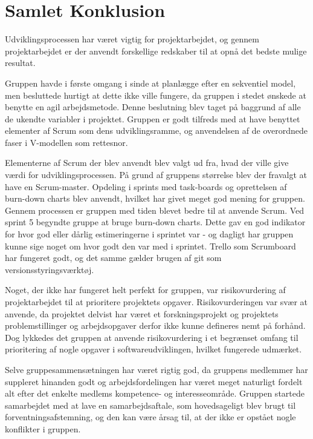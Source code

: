 \chapter{Samlet Konklusion}\label{SamletKonklusion}
Udviklingsprocessen har været vigtig for projektarbejdet, og gennem projektarbejdet er der anvendt forskellige redskaber til at opnå det bedste mulige resultat. 

Gruppen havde i første omgang i sinde at planlægge efter en sekventiel model, men besluttede hurtigt at dette ikke ville fungere, da gruppen i stedet ønskede at benytte en agil arbejdsmetode. Denne beslutning blev taget på baggrund af alle de ukendte variabler i projektet. Gruppen er godt tilfreds med at have benyttet elementer af Scrum som dens udviklingsramme, og anvendelsen af de overordnede faser i V-modellen som rettesnor.

Elementerne af Scrum der blev anvendt blev valgt ud fra, hvad der ville give værdi for udviklingsprocessen. På grund af gruppens størrelse blev der fravalgt at have en Scrum-master. Opdeling i sprints med task-boards og oprettelsen af burn-down charts blev anvendt, hvilket har givet meget god mening for gruppen. Gennem processen er gruppen med tiden blevet bedre til at anvende Scrum. Ved sprint 5 begyndte gruppe at bruge burn-down charts. Dette gav en god indikator for hvor god eller dårlig estimeringerne i sprintet var - og dagligt har gruppen kunne sige noget om hvor godt den var med i sprintet. Trello som Scrumboard har fungeret godt, og det samme gælder brugen af git som versionsstyringsværktøj.

Noget, der ikke har fungeret helt perfekt for gruppen, var risikovurdering af projektarbejdet til at prioritere projektets opgaver. Risikovurderingen var svær at anvende, da projektet delvist har været et forskningsprojekt og projektets problemstillinger og arbejdsopgaver derfor ikke kunne defineres nemt på forhånd. Dog lykkedes det gruppen at anvende risikovurdering i et begrænset omfang til prioritering af nogle opgaver i softwareudviklingen, hvilket fungerede udmærket. 

Selve gruppesammensætningen har været rigtig god, da gruppens medlemmer har suppleret hinanden godt og arbejdsfordelingen har været meget naturligt fordelt alt efter det enkelte medlems kompetence- og interesseområde. Gruppen startede samarbejdet med at lave en samarbejdsaftale, som hovedsageligt blev brugt til forventningsafstemning, og den kan være årsag til, at der ikke er opstået nogle konflikter i gruppen. 
